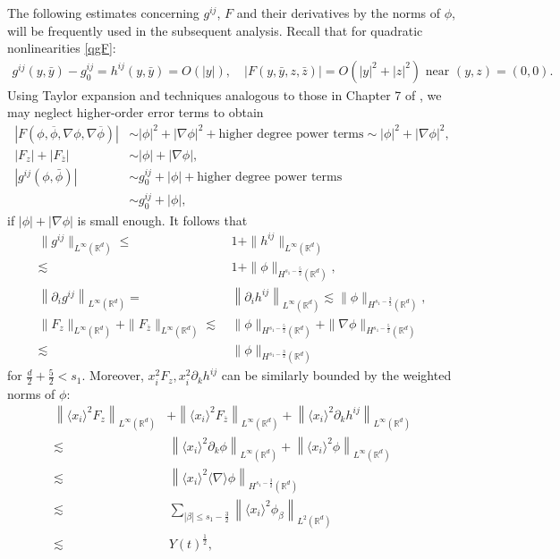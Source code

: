 \documentclass[10pt,twoside,a4paper]{article}
\numberwithin{equation}{section}\allowdisplaybreaks
\def\leq{\leqslant}
\begin{document}
The following estimates concerning 
 $ g^{ij} $, $ F $  and their derivatives by  the  norms of $ \phi $, will be frequently used in the subsequent analysis. Recall that for quadratic nonlinearities \eqref{qgF}:
\begin{align*}
	g^{ij}(y,\bar{y})-g_0^{ij}=h^{ij}(y, \bar{y})=O\left(|y|\right), \quad|F(y, \bar{y},z,\bar{z})| = O\left(|y|^2+|z|^2\right) \text{   near   }(y, z)=(0,0).
\end{align*}
Using Taylor expansion and techniques analogous to those in Chapter 7 of \cite{li2017nonlinear}, we may neglect higher-order error terms to obtain 
\begin{align*}
	\left| F\left(\phi,\overline{\phi},\nabla\phi, \nabla \overline{\phi}\right)\right|&\sim |\phi|^2+ |\nabla\phi|^2+  \text{higher degree power terms} \sim |\phi|^2+|\nabla\phi|^2,\\
	\left| F_z\right|+\left| F_{\overline{z}}\right|& \sim |\phi|+|\nabla\phi|,\\
\left|	g^{ij} (\phi,\bar{\phi})\right|&\sim  g^{ij}_0+  |\phi| +\text{higher degree power terms} \\
	& \sim  g^{ij}_0+|\phi|,
\end{align*}
if $ |\phi|+|\nabla \phi| $ is small enough. 
It follows that
\begin{align} 
		\|g^{ij}\|_{L^\infty(\mathbb{R}^d)}\leq&\, 1+\|h^{ij}\|_{L^\infty(\mathbb{R}^d)}\nonumber\\
	\lesssim &\,1+\|\phi\|_{H^{s_1-\frac 52}(\mathbb{R}^d)},\nonumber\\	
		\left\|\partial_{i}g^{ij}\right\|_{L^\infty(\mathbb{R}^{d})}
		=&\,\left\|	\partial_{i} h^{ij}  \right\|_{L^\infty(\mathbb{R}^{d})}  
	\lesssim \|  \phi \|_{H^{s_1-\frac 32}(\mathbb{R}^{d})}, \label{qg}\\
	\|F_z\|_{L^\infty(\mathbb{R}^{d})} +\|F_{\overline{z}} \|_{L^\infty(\mathbb{R}^{d})}
	\lesssim &\,\|\phi \|_{H^{s_1-\frac 52}(\mathbb{R}^{d})}+\|\nabla\phi \|_{H^{s_1-\frac 52}(\mathbb{R}^{d})}\nonumber\\
	\lesssim &\,\|\phi \|_{H^{s_1-\frac 32}(\mathbb{R}^{d})} 	\label{qF}
\end{align}
for  $\frac{d}{2}+\frac 52<  s_1. $ Moreover,  $ x_i^2 F_z, x_i^2  \partial_k h^{ij} $ can be similarly  bounded  by the weighted norms of $ \phi $:
\begin{align}
	\left\|\langle x_i\rangle^2  F_z   \right\|_{L^\infty(\mathbb{R}^d)}&+\left\| \langle x_i\rangle^2 F_{\overline{z}}   \right\|_{L^\infty(\mathbb{R}^d)}+\left\| \langle x_i\rangle^2\partial_k h^{ij}   \right\|_{L^\infty(\mathbb{R}^d)} \nonumber\\
	\lesssim &\, \left\| \langle x_i\rangle^2\partial_k \phi   \right\|_{L^\infty(\mathbb{R}^d)}+ \left\| \langle x_i\rangle^2 \phi  \right\|_{L^\infty(\mathbb{R}^d)} \label{qFx2}\\
	\lesssim &\,   \left\| \langle x_i\rangle^2\langle \nabla \rangle \phi  \right\|_{H^{s_1-\frac32}(\mathbb{R}^d)} \nonumber\\
	\lesssim &\,\sum_{|\beta| \leq s_1-\frac 32}\left\| \langle x_i\rangle^2 \phi_{\beta}\right\|_{L^2(\mathbb{R}^d)} \nonumber\\
	\lesssim& \,Y(t)^{\frac 12}, \nonumber
\end{align}
\end{document}
